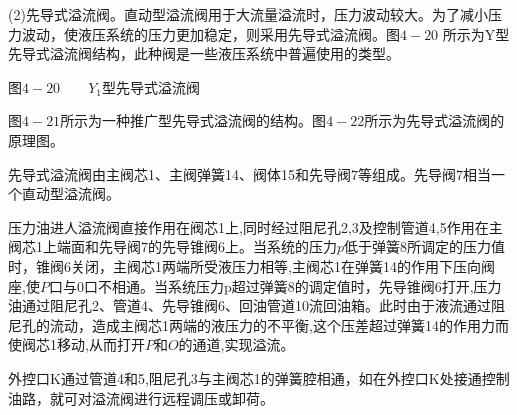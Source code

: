 (2)先导式溢流阀。直动型溢流阀用于大流量溢流时，压力波动较大。为了减小压力波动，使液压系统的压力更加稳定，则采用先导式溢流阀。图$4-20$ 所示为Y型先导式溢流阀结构，此种阀是一些液压系统中普遍使用的类型。


图$4-20\qquad Y_1$型先导式溢流阀

图$4-21$所示为一种推广型先导式溢流阀的结构。图$4-22$所示为先导式溢流阀的原理图。

先导式溢流阀由主阀芯1、主阀弹簧14、阀体15和先导阀$7$等组成。先导阀$7$相当一个直动型溢流阀。

压力油进人溢流阀直接作用在阀芯1上,同时经过阻尼孔2,3及控制管道4,5作用在主阀芯1上端面和先导阀$7$的先导锥阀6上。当系统的压力$p$低于弹簧8所调定的压力值时，锥阀6关闭，主阀芯1两端所受液压力相等,主阀芯1在弹簧14的作用下压向阀座,使$P$口与$0$口不相通。当系统压力p超过弹簧8的调定值时，先导锥阀6打开,压力油通过阻尼孔2、管道4、先导锥阀6、回油管道10流回油箱。此时由于液流通过阻尼孔的流动，造成主阀芯1两端的液压力的不平衡,这个压差超过弹簧14的作用力而使阀芯1移动,从而打开$P$和$O$的通道,实现溢流。

外控口K通过管道4和5,阻尼孔3与主阀芯1的弹簧腔相通，如在外控口K处接通控制油路，就可对溢流阀进行远程调压或卸荷。

